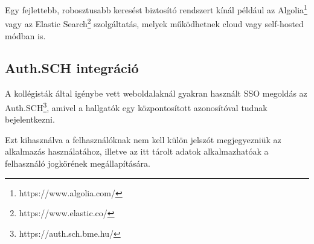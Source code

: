 Egy fejlettebb, robosztusabb keresést biztosító rendszert kínál például az Algolia\footnote{https://www.algolia.com/} vagy az Elastic Search\footnote{https://www.elastic.co/} szolgáltatás,
melyek működhetnek cloud vagy self-hosted módban is.

\subsection{Auth.SCH integráció}

A kollégisták által igénybe vett weboldalaknál gyakran használt SSO megoldás az Auth.SCH\footnote{https://auth.sch.bme.hu/}, amivel
a hallgatók egy központosított azonosítóval tudnak bejelentkezni.

Ezt kihasználva a felhasználóknak nem kell külön jelszót megjegyezniük az alkalmazás használatához,
illetve az itt tárolt adatok alkalmazhatóak a felhasználó jogkörének megállapítására.
